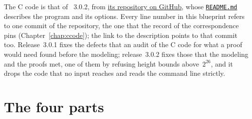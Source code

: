 The C code is that of \jpoints{}~3.0.2, from
\href{https://github.com/MichaelStollBayreuth/j-points}{its repository on GitHub}, whose
\href{https://github.com/MichaelStollBayreuth/j-points/blob/\jpointscommit/README.md}{\texttt{README.md}}
describes the program and its options. Every line number in this blueprint refers to one commit of
the repository, the one that the record of the correspondence pins (Chapter~\ref{chap:ccode}); the
link to the description points to that commit too. Release~3.0.1 fixes the defects that an audit of
the C code for what a proof would need found before the modeling; release~3.0.2 fixes those that the
modeling and the proofs met, one of them by refusing height bounds above~$2^{26}$, and it drops the
code that no input reaches and reads the command line strictly.

\section{The four parts}\label{sec:overviewParts}

